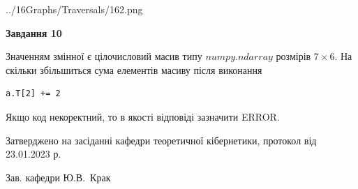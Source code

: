 \documentclass[12pt, ukrainian]{article}
\begin{document}
{\begin {large}
\begin{center}
	{../16Graphs/Traversals/162.png}
\end{center}\par
\newpage

{\begin {center}\textbf{Завдання 10}\end {center}}\par
Значенням змінної  є цілочисловий масив типу $numpy.ndarray$ розмірів $7{\times}6$. На скільки збільшиться сума елементів масиву  після виконання
\begin{verbatim}
a.T[2] += 2
\end{verbatim}


Якщо код некоректний, то в якості відповіді зазначити ERROR.\par
\newpage


\end {large}
}
{\smallskip \begin {small} Затверджено на засіданні кафедри теоретичної кібернетики, протокол  від   23.01.2023 р.\par\smallskip\smallskip
{\parbox {6.5 cm}{Зав. кафедри \dotfill Ю.В.~Крак}} \end{small}}
\end{document}
